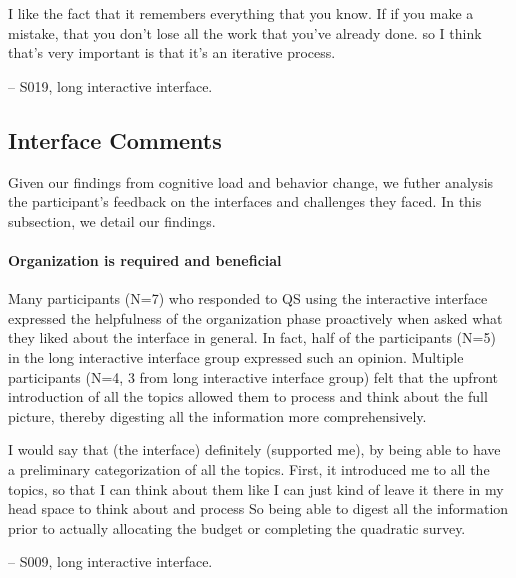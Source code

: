 \begin{displayquote}
I like the fact that it remembers everything that you know. If if you make a mistake, that you don't lose all the work that you've already done. so I think that's very important is that it's an iterative process.

\noindent \hfill -- S019, long interactive interface.
\end{displayquote}

\subsection{Interface Comments}
Given our findings from cognitive load and behavior change, we futher analysis the participant's feedback on the interfaces and challenges they faced. In this subsection, we detail our findings.

\paragraph{Organization is required and beneficial}
Many participants (N=7) who responded to QS using the interactive interface expressed the helpfulness of the organization phase proactively when asked what they liked about the interface in general. In fact, half of the participants (N=5) in the long interactive interface group expressed such an opinion. Multiple participants (N=4, 3 from long interactive interface group) felt that the upfront introduction of all the topics allowed them to process and think about the full picture, thereby digesting all the information more comprehensively. 

\begin{displayquote}
I would say that (the interface) definitely (supported me), by being able to have a preliminary categorization of all the topics. First, it introduced me to all the topics, so that I can think about them like I can just kind of leave it there in my head space to think about and process \bracketellipsis So being able to digest all the information prior to actually allocating the budget or completing the quadratic survey.

\noindent \hfill -- S009, long interactive interface.
\end{displayquote}


